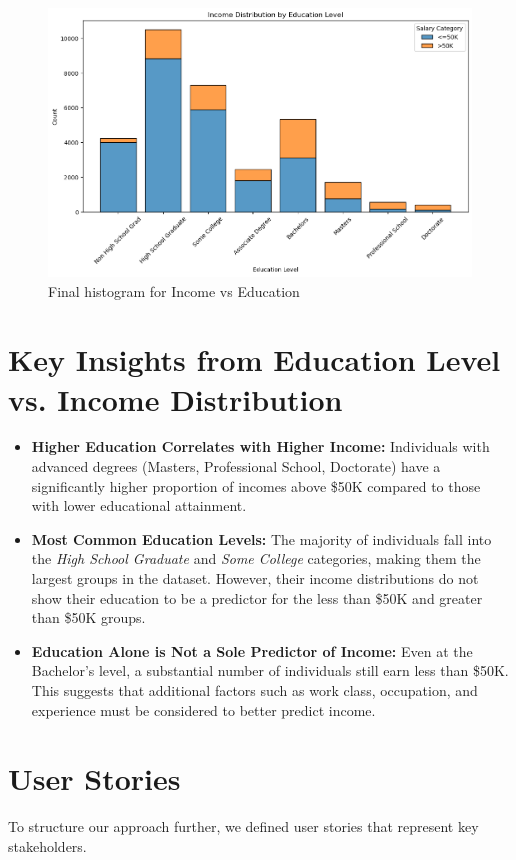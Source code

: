 \documentclass[journal,onecolumn]{IEEEtran}
\begin{document}
\begin{figure}[h]
    \centering
    \includegraphics[width=0.9\linewidth]{hist_4.png}  %
    \caption{Final histogram for Income vs Education}
    \label{fig:final_income_vs_education}
\end{figure}
\section{Key Insights from Education Level vs. Income Distribution}

\begin{itemize}
    \item \textbf{Higher Education Correlates with Higher Income:} Individuals with advanced degrees (Masters, Professional School, Doctorate) have a significantly higher proportion of incomes above \$50K compared to those with lower educational attainment.
    
    \item \textbf{Most Common Education Levels:} The majority of individuals fall into the \textit{High School Graduate} and \textit{Some College} categories, making them the largest groups in the dataset. However, their income distributions do not show their education to be a predictor for the less than \$50K and greater than \$50K groups.
    
    \item \textbf{Education Alone is Not a Sole Predictor of Income:} Even at the Bachelor's level, a substantial number of individuals still earn less than \$50K. This suggests that additional factors such as work class, occupation, and experience must be considered to better predict income.
\end{itemize}


\section{User Stories}
To structure our approach further, we defined user stories that represent key stakeholders.
\bigskip
\end{document}
